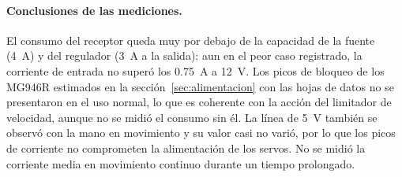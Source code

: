 \paragraph{Conclusiones de las mediciones.} El consumo del receptor queda muy por debajo de la capacidad de la fuente (\SI{4}{\ampere}) y del regulador (\SI{3}{\ampere} a la salida): aun en el peor caso registrado, la corriente de entrada no superó los \SI{0.75}{\ampere} a \SI{12}{\volt}. Los picos de bloqueo de los MG946R estimados en la sección~\ref{sec:alimentacion} con las hojas de datos no se presentaron en el uso normal, lo que es coherente con la acción del limitador de velocidad, aunque no se midió el consumo sin él. La línea de \SI{5}{\volt} también se observó con la mano en movimiento y su valor casi no varió, por lo que los picos de corriente no comprometen la alimentación de los servos. No se midió la corriente media en movimiento continuo durante un tiempo prolongado.

